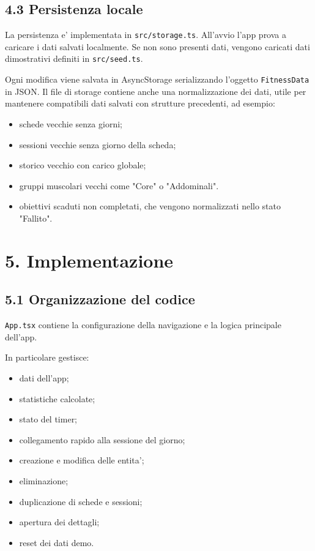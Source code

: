 \documentclass[11pt,a4paper]{article}
\begin{document}
\subsection{4.3 Persistenza locale}

La persistenza e' implementata in \texttt{src/storage.ts}. All'avvio l'app prova a caricare i dati salvati localmente. Se non sono presenti dati, vengono caricati dati dimostrativi definiti in \texttt{src/seed.ts}.

Ogni modifica viene salvata in AsyncStorage serializzando l'oggetto \texttt{FitnessData} in JSON. Il file di storage contiene anche una normalizzazione dei dati, utile per mantenere compatibili dati salvati con strutture precedenti, ad esempio:

\begin{itemize}
  \item schede vecchie senza giorni;
  \item sessioni vecchie senza giorno della scheda;
  \item storico vecchio con carico globale;
  \item gruppi muscolari vecchi come "Core" o "Addominali".
  \item obiettivi scaduti non completati, che vengono normalizzati nello stato "Fallito".
\end{itemize}

\section{5. Implementazione}

\subsection{5.1 Organizzazione del codice}

\texttt{App.tsx} contiene la configurazione della navigazione e la logica principale dell'app.

In particolare gestisce:

\begin{itemize}
  \item dati dell'app;
  \item statistiche calcolate;
  \item stato del timer;
  \item collegamento rapido alla sessione del giorno;
  \item creazione e modifica delle entita';
  \item eliminazione;
  \item duplicazione di schede e sessioni;
  \item apertura dei dettagli;
  \item reset dei dati demo.
\end{itemize}
\end{document}
